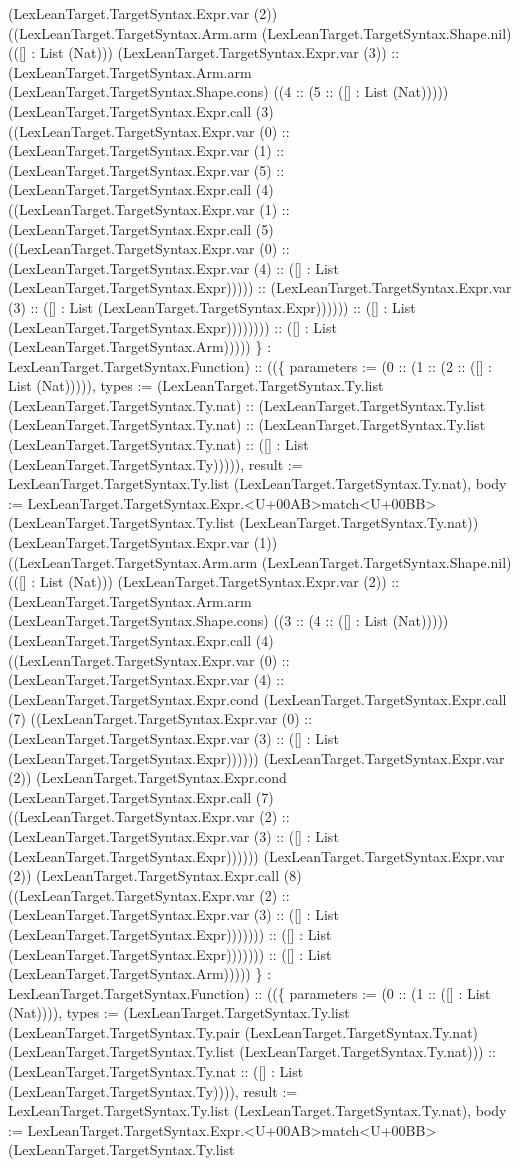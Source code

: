 \documentclass[11pt]{article}
\begin{document}
(LexLeanTarget.TargetSyntax.Expr.var (2)) ((LexLeanTarget.TargetSyntax.Arm.arm (LexLeanTarget.TargetSyntax.Shape.nil) (([] : List (Nat))) (LexLeanTarget.TargetSyntax.Expr.var (3)) :: (LexLeanTarget.TargetSyntax.Arm.arm (LexLeanTarget.TargetSyntax.Shape.cons) ((4 :: (5 :: ([] : List (Nat))))) (LexLeanTarget.TargetSyntax.Expr.call (3) ((LexLeanTarget.TargetSyntax.Expr.var (0) :: (LexLeanTarget.TargetSyntax.Expr.var (1) :: (LexLeanTarget.TargetSyntax.Expr.var (5) :: (LexLeanTarget.TargetSyntax.Expr.call (4) ((LexLeanTarget.TargetSyntax.Expr.var (1) :: (LexLeanTarget.TargetSyntax.Expr.call (5) ((LexLeanTarget.TargetSyntax.Expr.var (0) :: (LexLeanTarget.TargetSyntax.Expr.var (4) :: ([] : List (LexLeanTarget.TargetSyntax.Expr))))) :: (LexLeanTarget.TargetSyntax.Expr.var (3) :: ([] : List (LexLeanTarget.TargetSyntax.Expr)))))) :: ([] : List (LexLeanTarget.TargetSyntax.Expr)))))))) :: ([] : List (LexLeanTarget.TargetSyntax.Arm))))) \} : LexLeanTarget.TargetSyntax.Function) :: ((\{ parameters := (0 :: (1 :: (2 :: ([] : List (Nat))))), types := (LexLeanTarget.TargetSyntax.Ty.list (LexLeanTarget.TargetSyntax.Ty.nat) :: (LexLeanTarget.TargetSyntax.Ty.list (LexLeanTarget.TargetSyntax.Ty.nat) :: (LexLeanTarget.TargetSyntax.Ty.list (LexLeanTarget.TargetSyntax.Ty.nat) :: ([] : List (LexLeanTarget.TargetSyntax.Ty))))), result := LexLeanTarget.TargetSyntax.Ty.list (LexLeanTarget.TargetSyntax.Ty.nat), body := LexLeanTarget.TargetSyntax.Expr.<U+00AB>match<U+00BB> (LexLeanTarget.TargetSyntax.Ty.list (LexLeanTarget.TargetSyntax.Ty.nat)) (LexLeanTarget.TargetSyntax.Expr.var (1)) ((LexLeanTarget.TargetSyntax.Arm.arm (LexLeanTarget.TargetSyntax.Shape.nil) (([] : List (Nat))) (LexLeanTarget.TargetSyntax.Expr.var (2)) :: (LexLeanTarget.TargetSyntax.Arm.arm (LexLeanTarget.TargetSyntax.Shape.cons) ((3 :: (4 :: ([] : List (Nat))))) (LexLeanTarget.TargetSyntax.Expr.call (4) ((LexLeanTarget.TargetSyntax.Expr.var (0) :: (LexLeanTarget.TargetSyntax.Expr.var (4) :: (LexLeanTarget.TargetSyntax.Expr.cond (LexLeanTarget.TargetSyntax.Expr.call (7) ((LexLeanTarget.TargetSyntax.Expr.var (0) :: (LexLeanTarget.TargetSyntax.Expr.var (3) :: ([] : List (LexLeanTarget.TargetSyntax.Expr)))))) (LexLeanTarget.TargetSyntax.Expr.var (2)) (LexLeanTarget.TargetSyntax.Expr.cond (LexLeanTarget.TargetSyntax.Expr.call (7) ((LexLeanTarget.TargetSyntax.Expr.var (2) :: (LexLeanTarget.TargetSyntax.Expr.var (3) :: ([] : List (LexLeanTarget.TargetSyntax.Expr)))))) (LexLeanTarget.TargetSyntax.Expr.var (2)) (LexLeanTarget.TargetSyntax.Expr.call (8) ((LexLeanTarget.TargetSyntax.Expr.var (2) :: (LexLeanTarget.TargetSyntax.Expr.var (3) :: ([] : List (LexLeanTarget.TargetSyntax.Expr))))))) :: ([] : List (LexLeanTarget.TargetSyntax.Expr))))))) :: ([] : List (LexLeanTarget.TargetSyntax.Arm))))) \} : LexLeanTarget.TargetSyntax.Function) :: ((\{ parameters := (0 :: (1 :: ([] : List (Nat)))), types := (LexLeanTarget.TargetSyntax.Ty.list (LexLeanTarget.TargetSyntax.Ty.pair (LexLeanTarget.TargetSyntax.Ty.nat) (LexLeanTarget.TargetSyntax.Ty.list (LexLeanTarget.TargetSyntax.Ty.nat))) :: (LexLeanTarget.TargetSyntax.Ty.nat :: ([] : List (LexLeanTarget.TargetSyntax.Ty)))), result := LexLeanTarget.TargetSyntax.Ty.list (LexLeanTarget.TargetSyntax.Ty.nat), body := LexLeanTarget.TargetSyntax.Expr.<U+00AB>match<U+00BB> (LexLeanTarget.TargetSyntax.Ty.list 
\end{document}
